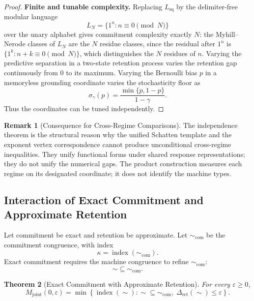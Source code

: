 \documentclass[12pt]{article}
\newtheorem{theorem}{Theorem}[section]
\theoremstyle{definition}
\newtheorem{remark}[theorem]{Remark}
\begin{document}
\begin{proof}
\medskip
\noindent\textbf{Finite and tunable complexity.}
Replacing $L_{\mathrm{sq}}$ by the delimiter-free modular language
\[
L_N=\{1^n:n\equiv0\pmod N\}
\]
over the unary alphabet gives commitment complexity exactly $N$: the
Myhill--Nerode classes of $L_N$ are the $N$ residue classes, since the
residual after $1^n$ is $\{1^k:n+k\equiv0\pmod N\}$, which distinguishes
the $N$ residues of $n$.  Varying the predictive separation in
a two-state retention process varies the retention gap continuously from $0$
to its maximum.  Varying the Bernoulli bias $p$ in a memoryless grounding
coordinate varies the stochasticity floor as
\[
\sigma_\gamma(p)
=
\frac{\min\{p,1-p\}}{1-\gamma}.
\]
Thus the coordinates can be tuned independently.
\end{proof}

\begin{remark}[Consequence for Cross-Regime Comparisons]
\label{rem:independence-use}
The independence theorem is the structural reason why the unified Schatten
template and the exponent vertex correspondence cannot produce unconditional
cross-regime inequalities.  They unify functional forms under shared response
representations; they do not unify the numerical gaps.  The product
construction measures each regime on its designated coordinate; it does not
identify the machine types.
\end{remark}

\subsection{Interaction of Exact Commitment and Approximate Retention}
\label{subsec:interaction}

Let commitment be exact and retention be approximate.  Let
$\sim_{\mathrm{com}}$ be the commitment congruence, with index
\[
\kappa=\operatorname{index}(\sim_{\mathrm{com}}).
\]
Exact commitment requires the machine congruence to refine
$\sim_{\mathrm{com}}$:
\[
\sim\subseteq\sim_{\mathrm{com}}.
\]

\begin{theorem}[Exact Commitment with Approximate Retention]
\label{thm:interaction}
For every $\varepsilon\ge0$,
\[
M_{\mathrm{joint}}(0,\varepsilon)
=
\min
\left\{
\operatorname{index}(\sim):
\sim\subseteq\sim_{\mathrm{com}},
\;
\Delta_{\mathrm{ret}}(\sim)\le\varepsilon
\right\}.
\]
\end{theorem}
\end{document}
